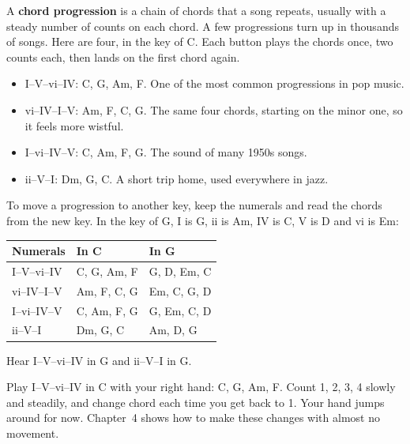 A \textbf{chord progression} is a chain of chords that a song repeats, usually with a steady number of counts on each chord. A few progressions turn up in thousands of songs. Here are four, in the key of C. Each button plays the chords once, two counts each, then lands on the first chord again.
\begin{itemize}
  \item I--V--vi--IV: C, G, Am, F. One of the most common progressions in pop music. 
  \item vi--IV--I--V: Am, F, C, G. The same four chords, starting on the minor one, so it feels more wistful. 
  \item I--vi--IV--V: C, Am, F, G. The sound of many 1950s songs. 
  \item ii--V--I: Dm, G, C. A short trip home, used everywhere in jazz. 
\end{itemize}

To move a progression to another key, keep the numerals and read the chords from the new key. In the key of G, I is G, ii is Am, IV is C, V is D and vi is Em:

\begin{center}
\begin{tabular}{lll}
\toprule
Numerals & In C & In G \\
\midrule
I--V--vi--IV & C, G, Am, F & G, D, Em, C \\
vi--IV--I--V & Am, F, C, G & Em, C, G, D \\
I--vi--IV--V & C, Am, F, G & G, Em, C, D \\
ii--V--I & Dm, G, C & Am, D, G \\
\bottomrule
\end{tabular}
\end{center}

Hear I--V--vi--IV in G  and ii--V--I in G. 

\begin{tryitbox}
Play I--V--vi--IV in C with your right hand: C, G, Am, F. Count 1, 2, 3, 4 slowly and steadily, and change chord each time you get back to 1. Your hand jumps around for now. Chapter~4 shows how to make these changes with almost no movement.
\end{tryitbox}

